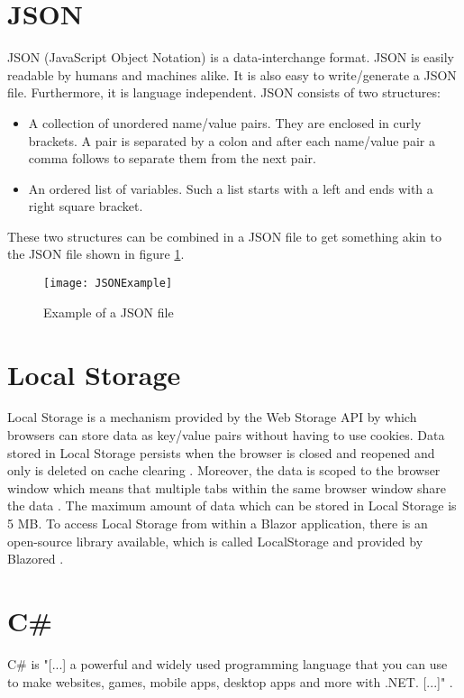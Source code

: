\section{JSON}
JSON (JavaScript Object Notation) \cite{json_url} is a data-interchange format. JSON is easily readable by humans and machines alike. It is also easy to write/generate a JSON file. Furthermore, it is language independent.\newline
JSON consists of two structures:
\begin{itemize}
	\item A collection of unordered name/value pairs. They are enclosed in curly brackets. A pair is separated by a colon and after each name/value pair a comma follows to separate them from the next pair.
	\item An ordered list of variables. Such a list starts with a left and ends with a right square bracket.
\end{itemize}
These two structures can be combined in a JSON file to get something akin to the JSON file shown in figure \ref{json}.

\begin{figure}[H]
	\centering
	\texttt{[image: JSONExample]}
	\caption{Example of a JSON file}
	\label{json}
\end{figure}

\section{Local Storage} \label{Local Storage}
Local Storage is a mechanism provided by the Web Storage API by which browsers can store data as key/value pairs without having to use cookies. Data stored in Local Storage persists when the browser is closed and reopened and only is deleted on cache clearing \cite{web-storage-api-url}. Moreover, the data is scoped to the browser window which means that multiple tabs within the same browser window share the data \cite{blazor-state-management-url}. The maximum amount of data which can be stored in Local Storage is 5 MB. To access Local Storage from within a Blazor application, there is an open-source library available, which is called LocalStorage and provided by Blazored \cite{local-storage-url}.

\section{C\#}
C\# is "[...] a powerful and widely used programming language that you can use to make websites, games, mobile apps, desktop apps and more with .NET. [...]" \cite{csharp-url}.